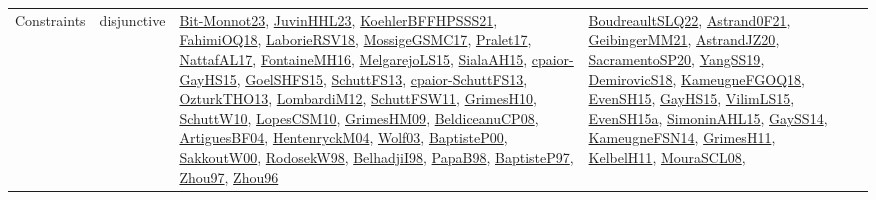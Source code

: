 {\begin{longtable}{llp{6cm}p{6cm}p{6cm}}
Constraints & disjunctive & \href{papers/Bit-Monnot23.pdf}{Bit-Monnot23}\cite{Bit-Monnot23}, \href{papers/JuvinHHL23.pdf}{JuvinHHL23}\cite{JuvinHHL23}, \href{articles/KoehlerBFFHPSSS21.pdf}{KoehlerBFFHPSSS21}\cite{KoehlerBFFHPSSS21}, \href{articles/FahimiOQ18.pdf}{FahimiOQ18}\cite{FahimiOQ18}, \href{articles/LaborieRSV18.pdf}{LaborieRSV18}\cite{LaborieRSV18}, \href{papers/MossigeGSMC17.pdf}{MossigeGSMC17}\cite{MossigeGSMC17}, \href{papers/Pralet17.pdf}{Pralet17}\cite{Pralet17}, \href{articles/NattafAL17.pdf}{NattafAL17}\cite{NattafAL17}, \href{papers/FontaineMH16.pdf}{FontaineMH16}\cite{FontaineMH16}, \href{papers/MelgarejoLS15.pdf}{MelgarejoLS15}\cite{MelgarejoLS15}, \href{papers/SialaAH15.pdf}{SialaAH15}\cite{SialaAH15}, \href{papers/cpaior-GayHS15.pdf}{cpaior-GayHS15}\cite{cpaior-GayHS15}, \href{articles/GoelSHFS15.pdf}{GoelSHFS15}\cite{GoelSHFS15}, \href{papers/SchuttFS13.pdf}{SchuttFS13}\cite{SchuttFS13}, \href{papers/cpaior-SchuttFS13.pdf}{cpaior-SchuttFS13}\cite{cpaior-SchuttFS13}, \href{articles/OzturkTHO13.pdf}{OzturkTHO13}\cite{OzturkTHO13}, \href{articles/LombardiM12.pdf}{LombardiM12}\cite{LombardiM12}, \href{articles/SchuttFSW11.pdf}{SchuttFSW11}\cite{SchuttFSW11}, \href{papers/GrimesH10.pdf}{GrimesH10}\cite{GrimesH10}, \href{papers/SchuttW10.pdf}{SchuttW10}\cite{SchuttW10}, \href{articles/LopesCSM10.pdf}{LopesCSM10}\cite{LopesCSM10}, \href{papers/GrimesHM09.pdf}{GrimesHM09}\cite{GrimesHM09}, \href{papers/BeldiceanuCP08.pdf}{BeldiceanuCP08}\cite{BeldiceanuCP08}, \href{papers/ArtiguesBF04.pdf}{ArtiguesBF04}\cite{ArtiguesBF04}, \href{papers/HentenryckM04.pdf}{HentenryckM04}\cite{HentenryckM04}, \href{papers/Wolf03.pdf}{Wolf03}\cite{Wolf03}, \href{articles/BaptisteP00.pdf}{BaptisteP00}\cite{BaptisteP00}, \href{articles/SakkoutW00.pdf}{SakkoutW00}\cite{SakkoutW00}, \href{papers/RodosekW98.pdf}{RodosekW98}\cite{RodosekW98}, \href{articles/BelhadjiI98.pdf}{BelhadjiI98}\cite{BelhadjiI98}, \href{articles/PapaB98.pdf}{PapaB98}\cite{PapaB98}, \href{papers/BaptisteP97.pdf}{BaptisteP97}\cite{BaptisteP97}, \href{articles/Zhou97.pdf}{Zhou97}\cite{Zhou97}, \href{papers/Zhou96.pdf}{Zhou96}\cite{Zhou96} & \href{papers/BoudreaultSLQ22.pdf}{BoudreaultSLQ22}\cite{BoudreaultSLQ22}, \href{papers/Astrand0F21.pdf}{Astrand0F21}\cite{Astrand0F21}, \href{papers/GeibingerMM21.pdf}{GeibingerMM21}\cite{GeibingerMM21}, \href{articles/AstrandJZ20.pdf}{AstrandJZ20}\cite{AstrandJZ20}, \href{articles/SacramentoSP20.pdf}{SacramentoSP20}\cite{SacramentoSP20}, \href{papers/YangSS19.pdf}{YangSS19}\cite{YangSS19}, \href{papers/DemirovicS18.pdf}{DemirovicS18}\cite{DemirovicS18}, \href{papers/KameugneFGOQ18.pdf}{KameugneFGOQ18}\cite{KameugneFGOQ18}, \href{papers/EvenSH15.pdf}{EvenSH15}\cite{EvenSH15}, \href{papers/GayHS15.pdf}{GayHS15}\cite{GayHS15}, \href{papers/VilimLS15.pdf}{VilimLS15}\cite{VilimLS15}, \href{articles/EvenSH15a.pdf}{EvenSH15a}\cite{EvenSH15a}, \href{articles/SimoninAHL15.pdf}{SimoninAHL15}\cite{SimoninAHL15}, \href{papers/GaySS14.pdf}{GaySS14}\cite{GaySS14}, \href{articles/KameugneFSN14.pdf}{KameugneFSN14}\cite{KameugneFSN14}, \href{papers/GrimesH11.pdf}{GrimesH11}\cite{GrimesH11}, \href{articles/KelbelH11.pdf}{KelbelH11}\cite{KelbelH11}, \href{papers/MouraSCL08.pdf}{MouraSCL08}\cite{MouraSCL08}, 
\end{longtable}}

